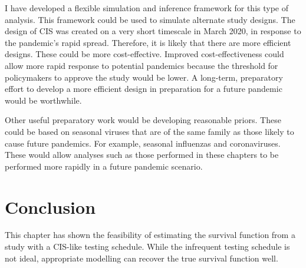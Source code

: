 \documentclass[thesis.tex]{subfiles}
\begin{document}
I have developed a flexible simulation and inference framework for this type of analysis.
This framework could be used to simulate alternate study designs.
The design of CIS was created on a very short timescale in March 2020, in response to the pandemic's rapid spread.
Therefore, it is likely that there are more efficient designs.
These could be more cost-effective.
Improved cost-effectiveness could allow more rapid response to potential pandemics because the threshold for policymakers to approve the study would be lower.
A long-term, preparatory effort to develop a more efficient design in preparation for a future pandemic would be worthwhile.

Other useful preparatory work would be developing reasonable priors.
These could be based on seasonal viruses that are of the same family as those likely to cause future pandemics.
For example, seasonal influenzas and coronaviruses.
These would allow analyses such as those performed in these chapters to be performed more rapidly in a future pandemic scenario.

\section{Conclusion} \label{perf-test:sec:conclusion}
This chapter has shown the feasibility of estimating the survival function from a study with a CIS-like testing schedule.
While the infrequent testing schedule is not ideal, appropriate modelling can recover the true survival function well.


\ifSubfilesClassLoaded{
  \appendix
  
  \listoftodos
}{}
\end{document}
